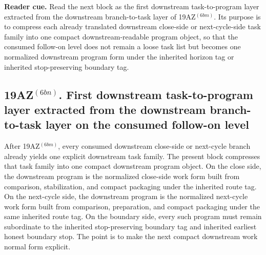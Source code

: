 \noindent\textbf{Reader cue.} Read the next block as the first downstream task-to-program layer extracted from the downstream branch-to-task layer of 19AZ$^{(6bm)}$. Its purpose is to compress each already translated downstream close-side or next-cycle-side task family into one compact downstream-readable program object, so that the consumed follow-on level does not remain a loose task list but becomes one normalized downstream program form under the inherited horizon tag or inherited stop-preserving boundary tag.

\subsection*{19AZ$^{(6bn)}$. First downstream task-to-program layer extracted from the downstream branch-to-task layer on the consumed follow-on level}
\label{sec:first-downstream-task-to-program-layer-extracted-from-the-downstream-branch-to-task-layer-on-the-consumed-follow-on-level}
After 19AZ$^{(6bm)}$, every consumed downstream close-side or next-cycle branch already yields one explicit downstream task family. The present block compresses that task family into one compact downstream program object. On the close side, the downstream program is the normalized close-side work form built from comparison, stabilization, and compact packaging under the inherited route tag. On the next-cycle side, the downstream program is the normalized next-cycle work form built from comparison, preparation, and compact packaging under the same inherited route tag. On the boundary side, every such program must remain subordinate to the inherited stop-preserving boundary tag and inherited earliest honest boundary stop. The point is to make the next compact downstream work normal form explicit.

